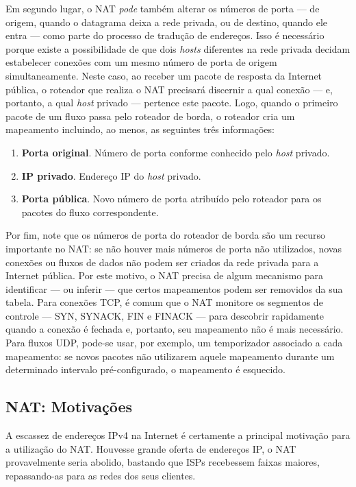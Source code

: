 \documentclass{article}
\begin{document}
Em segundo lugar, o NAT \textit{pode} também alterar os números de porta --- de origem, quando o datagrama deixa a rede privada, ou de destino, quando ele entra --- como parte do processo de tradução de endereços. Isso é necessário porque existe a possibilidade de que dois \textit{hosts} diferentes na rede privada decidam estabelecer conexões com um mesmo número de porta de origem simultaneamente. Neste caso, ao receber um pacote de resposta da Internet pública, o roteador que realiza o NAT precisará discernir a qual conexão --- e, portanto, a qual \textit{host} privado --- pertence este pacote. Logo, quando o primeiro pacote de um fluxo passa pelo roteador de borda, o roteador cria um mapeamento incluindo, ao menos, as seguintes três informações:
\begin{enumerate}
    \item \textbf{Porta original}. Número de porta conforme conhecido pelo \textit{host} privado.
    \item \textbf{IP privado}. Endereço IP do \textit{host} privado.
    \item \textbf{Porta pública}. Novo número de porta atribuído pelo roteador para os pacotes do fluxo correspondente.
\end{enumerate}

Por fim, note que os números de porta do roteador de borda são um recurso importante no NAT: se não houver mais números de porta não utilizados, novas conexões ou fluxos de dados não podem ser criados da rede privada para a Internet pública. Por este motivo, o NAT precisa de algum mecanismo para identificar --- ou inferir --- que certos mapeamentos podem ser removidos da sua tabela. Para conexões TCP, é comum que o NAT monitore os segmentos de controle --- SYN, SYNACK, FIN e FINACK --- para descobrir rapidamente quando a conexão é fechada e, portanto, seu mapeamento não é mais necessário. Para fluxos UDP, pode-se usar, por exemplo, um temporizador associado a cada mapeamento: se novos pacotes não utilizarem aquele mapeamento durante um determinado intervalo pré-configurado, o mapeamento é esquecido.

\subsection{NAT: Motivações}

A escassez de endereços IPv4 na Internet é certamente a principal motivação para a utilização do NAT. Houvesse grande oferta de endereços IP, o NAT provavelmente seria abolido, bastando que ISPs recebessem faixas maiores, repassando-as para as redes dos seus clientes.
\end{document}
